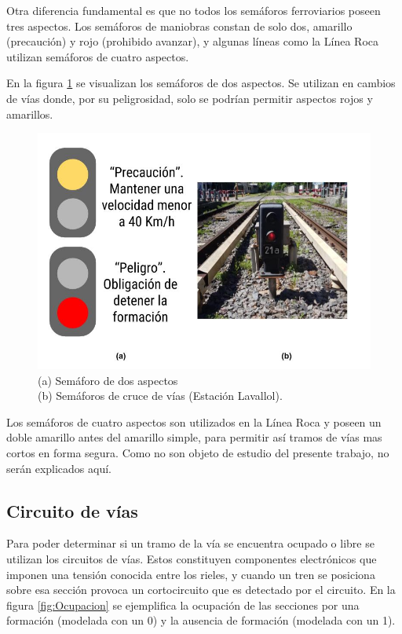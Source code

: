 			Otra diferencia fundamental es que no todos los semáforos ferroviarios poseen tres aspectos. Los semáforos de maniobras constan de solo dos, amarillo (precaución) y rojo (prohibido avanzar), y algunas líneas como la Línea Roca utilizan semáforos de cuatro aspectos.	
			
			En la figura \ref{fig:Sem_2Aspectos} se visualizan los semáforos de dos aspectos. Se utilizan en cambios de vías donde, por su peligrosidad, solo se podrían permitir aspectos rojos y amarillos.
			 
			 \begin{figure}[htbp!]
				\centering
				\includegraphics[scale=.28]{./Figures/Sem2}
				\caption{(a) Semáforo de dos aspectos\\(b) Semáforos de cruce de vías (Estación Lavallol).}
				\label{fig:Sem_2Aspectos}
			\end{figure}				
			
			\vspace{10cm}
			
			Los semáforos de cuatro aspectos son utilizados en la Línea Roca y poseen un doble amarillo antes del amarillo simple, para permitir así tramos de vías mas cortos en forma segura. Como no son objeto de estudio del presente trabajo, no serán explicados aquí.
		
		\subsection{Circuito de vías}
		\label{CVs}
		
			Para poder determinar si un tramo de la vía se encuentra ocupado o libre se utilizan los circuitos de vías. Estos constituyen componentes electrónicos que imponen una tensión conocida entre los rieles, y cuando un tren se posiciona sobre esa sección provoca un cortocircuito que es detectado por el circuito. En la figura \ref{fig:Ocupacion} se ejemplifica la ocupación de las secciones por una formación (modelada con un 0) y la ausencia de formación (modelada con un 1).
			
